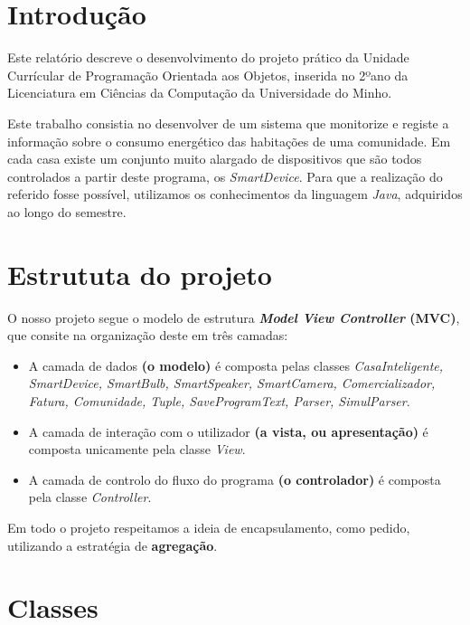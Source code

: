 \documentclass[11pt,a4paper]{report}
\begin{document}
	\tableofcontents
	
	\pagebreak
	
	\chapter{Introdução}
%	
	Este relatório descreve o desenvolvimento do projeto prático da Unidade Currícular de Programação Orientada aos Objetos, inserida no 2ºano da Licenciatura em Ciências da Computação da Universidade do Minho.
	
	Este trabalho consistia no desenvolver de um sistema que monitorize e registe a informação sobre o consumo
energético das habitações de uma comunidade. Em cada casa existe um conjunto muito alargado de dispositivos que são todos controlados a partir deste programa, os \textit{SmartDevice}. Para que a realização do referido fosse possível, utilizamos os conhecimentos da linguagem \textit{Java}, adquiridos ao longo do semestre.  
	
	\pagebreak
	
	\chapter{Estrututa do projeto}

O nosso projeto segue o modelo de estrutura \textbf{\textit{Model View Controller} (MVC)}, que consite na organização deste em três camadas:
	\begin{itemize}
		\item A camada de dados \textbf{(o modelo)} é composta pelas classes \textit{CasaInteligente, SmartDevice, SmartBulb, SmartSpeaker, SmartCamera, Comercializador, Fatura, Comunidade, Tuple, SaveProgramText, Parser, SimulParser}.
		\item A camada de interação com o utilizador \textbf{(a vista, ou apresentação)} é composta unicamente pela classe \textit{View}.
		\item A camada de controlo do fluxo do programa\textbf{ (o controlador)} é composta pela classe \textit{Controller}.
	\end{itemize}
        Em todo o projeto respeitamos a ideia de encapsulamento, como pedido, utilizando a estratégia de \textbf{agregação}.


\pagebreak

	\chapter{Classes}
	
\end{document}

